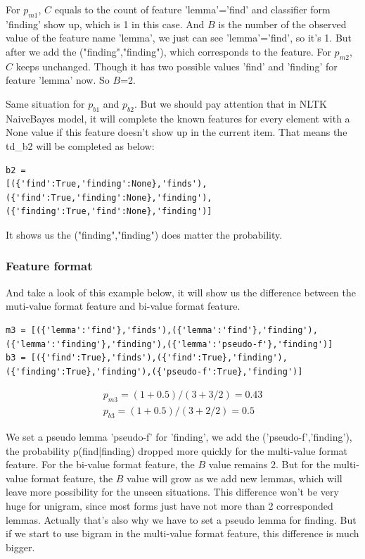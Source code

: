 \documentclass[a4paper]{article}
\begin{document}
For $p_{m1}$, $C$ equals to the count of feature 'lemma'='find' and classifier form 'finding' show up, which is 1 in this case. And $B$ is the number of the observed value of the feature name 'lemma', we just can see 'lemma'='find', so it's 1.
But after we add the ("finding","finding"), which corresponds to the feature. For $p_{m2}$, $C$ keeps unchanged. Though it has two possible values 'find' and 'finding' for feature 'lemma' now. So $B$=2.

Same situation for $p_{b1}$ and $p_{b2}$. But we should pay attention that in NLTK NaiveBayes model, it will complete the known features for every element with a None value if this feature doesn't show up in the current item. That means the td\_b2 will be completed as below:
\begin{lstlisting}
b2 =
[({'find':True,'finding':None},'finds'),
({'find':True,'finding':None},'finding'),
({'finding':True,'find':None},'finding')]
\end{lstlisting}

It shows us the ("finding","finding") does matter the probability. 
\subsubsection{Feature format}
And take a look of this example below, it will show us the difference between the muti-value format feature and bi-value format feature.

\begin{lstlisting}
m3 = [({'lemma':'find'},'finds'),({'lemma':'find'},'finding'), ({'lemma':'finding'},'finding'),({'lemma':'pseudo-f'},'finding')]
b3 = [({'find':True},'finds'),({'find':True},'finding'),
({'finding':True},'finding'),({'pseudo-f':True},'finding')]
\end{lstlisting}
\begin{align*}
p_{m3}=(1+0.5)/(3+3/2)=0.43 \\
p_{b3}=(1+0.5)/(3+2/2)=0.5 
\end{align*}


We set a pseudo lemma 'pseudo-f' for 'finding', we add the ('pseudo-f','finding'), the probability p(find|finding) dropped more quickly for the multi-value format feature. For the bi-value format feature, the $B$ value remains 2. But for the multi-value format feature, the $B$ value will grow as we add new lemmas, which will leave more possibility for the unseen situations. This difference won't be very huge for unigram, since most forms just have not more than 2 corresponded lemmas. Actually that's also why we have to set a pseudo lemma for finding. But if we start to use bigram in the multi-value format feature, this difference is much bigger.
\end{document}
